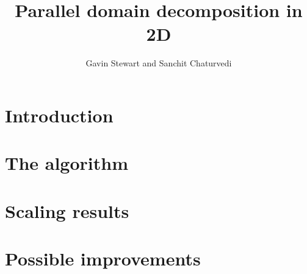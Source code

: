 \documentclass{article}
\title{Parallel domain decomposition in 2D}
\author{Gavin Stewart and Sanchit Chaturvedi}
\begin{document}
	\section{Introduction}
	
	\section{The algorithm}
	
	\section{Scaling results}
	
	\section{Possible improvements}
	
	\begin{thebibliography}{9}
		
	\end{thebibliography}
\end{document}
